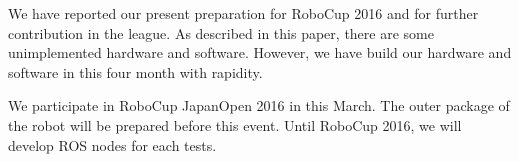 \documentclass{llncs}
\begin{document}
We have reported our present preparation for
RoboCup 2016 and for further contribution in the league.
As described in this paper, there are some unimplemented
hardware and software. However, we have build our hardware
and software in this four month with rapidity.

We participate in RoboCup JapanOpen 2016 in this March.
The outer package of the robot will be prepared before
this event. Until RoboCup 2016, we will develop
ROS nodes for each tests.





\end{document}
